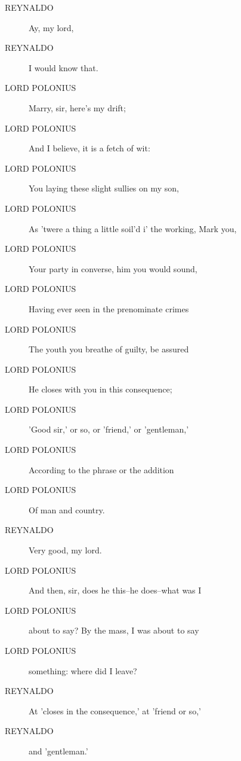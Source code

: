 \documentclass{article}
\begin{document}
\begin{description}
            
\item[REYNALDO] Ay, my lord,
\item[REYNALDO] I would know that.
\end{description}
          
\begin{description}
            
\item[LORD POLONIUS] Marry, sir, here's my drift;
\item[LORD POLONIUS] And I believe, it is a fetch of wit:
\item[LORD POLONIUS] You laying these slight sullies on my son,
\item[LORD POLONIUS] As 'twere a thing a little soil'd i' the working, Mark you,
\item[LORD POLONIUS] Your party in converse, him you would sound,
\item[LORD POLONIUS] Having ever seen in the prenominate crimes
\item[LORD POLONIUS] The youth you breathe of guilty, be assured
\item[LORD POLONIUS] He closes with you in this consequence;
\item[LORD POLONIUS] 'Good sir,' or so, or 'friend,' or 'gentleman,'
\item[LORD POLONIUS] According to the phrase or the addition
\item[LORD POLONIUS] Of man and country.
\end{description}
          
\begin{description}
            
\item[REYNALDO] Very good, my lord.
\end{description}
          
\begin{description}
            
\item[LORD POLONIUS] And then, sir, does he this--he does--what was I
\item[LORD POLONIUS] about to say? By the mass, I was about to say
\item[LORD POLONIUS] something: where did I leave?
\end{description}
          
\begin{description}
            
\item[REYNALDO] At 'closes in the consequence,' at 'friend or so,'
\item[REYNALDO] and 'gentleman.'
\end{description}
          
\end{document}
